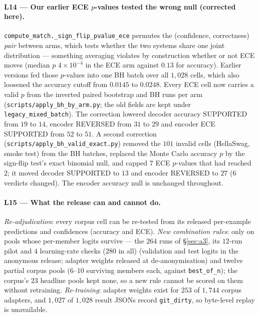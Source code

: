 \documentclass[11pt]{article}
\begin{document}
\paragraph{L14 — Our earlier ECE $p$-values tested the wrong null (corrected here).} \texttt{compute\_\allowbreak match.\_\allowbreak sign\_\allowbreak flip\_\allowbreak pvalue\_\allowbreak ece} permutes the (confidence, correctness) \emph{pair} between arms, which tests whether the two systems share one joint distribution --- something averaging violates by construction whether or not ECE moves (median $p$ $4\times10^{-4}$ in the ECE arm against $0.13$ for accuracy). Earlier versions fed those $p$-values into one BH batch over all $1{,}028$ cells, which also loosened the accuracy cutoff from $0.0145$ to $0.0248$. Every ECE cell now carries a valid $p$ from the inverted paired bootstrap and BH runs per arm (\texttt{scripts/\allowbreak apply\_\allowbreak bh\_\allowbreak by\_\allowbreak arm.\allowbreak py}; the old fields are kept under \texttt{legacy\_\allowbreak mixed\_\allowbreak batch}). The correction lowered decoder accuracy SUPPORTED from $19$ to $14$, encoder REVERSED from $31$ to $29$ and encoder ECE SUPPORTED from $52$ to $51$. A second correction (\texttt{scripts/\allowbreak apply\_\allowbreak bh\_\allowbreak valid\_\allowbreak exact.\allowbreak py}) removed the $101$ invalid cells (HellaSwag, smoke test) from the BH batches, replaced the Monte Carlo accuracy $p$ by the sign-flip test's exact binomial null, and capped $7$ ECE $p$-values that had reached $2$; it moved decoder SUPPORTED to $13$ and encoder REVERSED to $27$ ($6$ verdicts changed). The encoder accuracy null is unchanged throughout.

\paragraph{L15 — What the release can and cannot do.} \emph{Re-adjudication}: every corpus cell can be re-tested from its released per-example predictions and confidences (accuracy and ECE). \emph{New combination rules}: only on pools whose per-member logits survive --- the $264$ runs of \S\ref{sec:a3}, its $12$-run pilot and $4$ learning-rate checks ($280$ in all) (validation and test logits in the anonymous release; adapter weights released at de-anonymisation) and twelve partial corpus pools ($6$--$10$ surviving members each, against \texttt{best\_of\_n}); the corpus's $23$ headline pools kept none, so a new rule cannot be scored on them without retraining. \emph{Re-training}: adapter weights exist for $253$ of $1{,}744$ corpus adapters, and $1{,}027$ of $1{,}028$ result JSONs record \texttt{git\_dirty}, so byte-level replay is unavailable.
\end{document}
